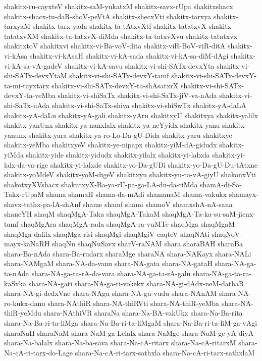 {shakitx-ru-cayxteV
shakitx-saM-yukatxM
shakitx-savx-rUpa
shakitxshacx
shakitx-shacx-tu-daR-shoV-peVtA
shakitx-shecxVti
shakitx-tarxya
shakitx-tarxyaM
shakitx-tarx-yada
shakitx-ta-tAtxvXtf
shakitx-tatatxvX
shakitx-tatatxvXM
shakitx-ta-tatxvX-diMda
shakitx-ta-tatxvXvu
shakitx-tatatxvx
shakitxtoV
shakitxvi
shakitx-vi-Ba-voV-dita
shakitx-viR-BoV-viR-ditA
shakitx-vi-kAsa
shakitx-vi-kAsaH
shakitx-vi-kA-sada
shakitx-vi-kA-sa-diM-dAgi
shakitx-vi-kA-sa-vA-gadeV
shakitx-vi-kA-savu
shakitx-vi-shi-SATx-devxYta
shakitx-vi-shi-SATx-devxYtaM
shakitx-vi-shi-SATx-devxY-tamf
shakitx-vi-shi-SATx-devxY-ta-mi-tayxtarx
shakitx-vi-shi-SATx-devxY-ta-shAsatxrX
shakitx-vi-shi-SATx-devxY-ta-veMba
shakitx-vi-shiSaTx
shakitx-vi-shi-SaTx-jiV-va-nAda
shakitx-vi-shi-SaTx-nAda
shakitx-vi-shi-SaTx-shiva
shakitx-vi-shiSwTx
shakitx-yA-daLA
shakitx-yA-daLu
shakitx-yA-gali
shakitx-yAru
shakitxyU
shakitxya
shakitx-yalilx
shakitx-yanUnx
shakitx-ya-nanxlalx
shakitx-ya-neYyidx
shakitx-yanu
shakitx-yanunx
shakitx-yara
shakitx-ya-ro-Lo-Da-gU-Dida
shakitx-yaru
shakitxye
shakitx-yeMba
shakitxyeV
shakitx-ye-nipapx
shakitx-yiM-dA-gidudx
shakitx-yiMda
shakitx-yide
shakitx-yidudx
shakitx-yilalx
shakitx-yi-lalxda
shakitx-yi-lalx-da-va-rige
shakitx-yi-lalxde
shakitx-yo-Da-gUDi
shakitx-yo-Da-gU-Du-tAtxne
shakitx-yoMdeV
shakitx-yoM-digeV
shakitxyu
shakitx-yu-ta-vA-giyU
shakonxVti
shakotxyXVshacx
shakutxyX-Ba-ya-rU-pa-ga-LA-du-da-riMda
shamA-di-Sa-Takx-rUpaM
shama
shamaH
shama-da-mAdi
shamanaM
shama-vakukx
shamayx-shavx-tathx-pa-lA-shAnf
shame
shamf
shami
shamoV
shamxshA-nA-sana
shaneYH
shaqM
shaqMgA-Taka
shaqMgA-TakaM
shaqMgA-Ta-ka-su-saM-jicnx-tamf
shaqMgAra
shaqMgA-rada
shaqMgA-ra-vuMTe
shaqMga
shaqMgaM
shaqMga-dalilx
shaqMga-risi
shaqMgi
shaqMgiV-caqteV
shaqNAti
shaqNoV-mayx-kaNaRH
shaqNu
shaqNuSavx
sharV-raNAM
shara
sharaBAH
sharaBa
shara-Ba-nAda
shara-Ba-rudarx
sharaMge
sharaNA
shara-NAKayx
shara-NALi
shara-NAMgaM
shara-NA-da-vanu
shara-NA-gata
shara-NA-gataH
shara-NA-ga-ta-nAda
shara-NA-ga-ta-rA-da-vara
shara-NA-ga-ta-rA-galu
shara-NA-ga-ta-ra-kaSxka
shara-NA-gati
shara-NA-ga-ti-vokekx
shara-NA-gi-dAdx-neM-dathaR
shara-NA-gi-dedxVne
shara-NAgu
shara-NA-gu-vudu
shara-NAnAM
shara-NA-ro-kukx-danu
shara-NAthiR
shara-NA-thiRVti
shara-NA-thiR-yeMba
shara-NA-thiR-yeMdu
shara-NAthiVR
sharaNa
shara-Na-BA-vakUkx
shara-Na-Ba-rita
shara-Na-Ba-ri-ta-liMga
shara-Na-Ba-ri-ta-liMgaM
shara-Na-Ba-ri-ta-liM-ga-vAgi
sharaNaH
sharaNaM
shara-NaM-ga-Lelalx
shara-NaMge
shara-NaM-ge-yA-diyA
shara-Na-balalx
shara-Na-ba-sava
shara-Na-cA-ritarx
shara-Na-cA-ritarxM
shara-Na-cA-ri-tarx-do-Lage
shara-Na-cA-ri-tarx-sathxla
shara-Na-cA-ri-tarx-sathxlaM
}
